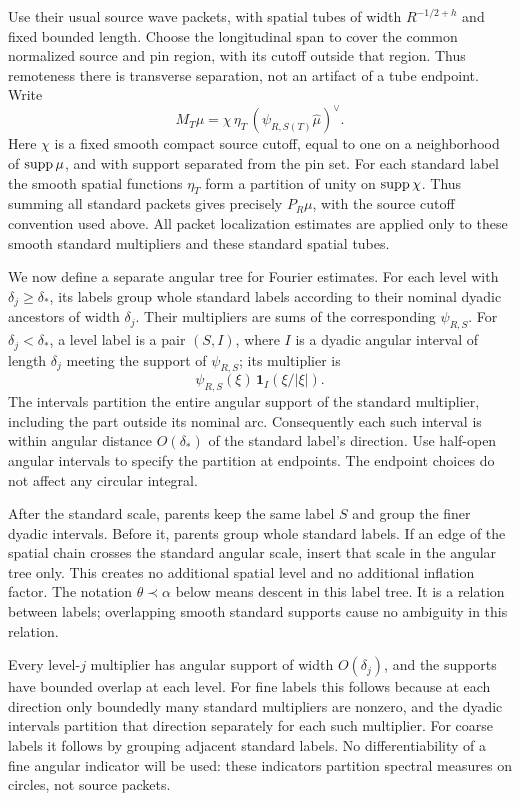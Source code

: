 Use their usual source wave packets, with spatial tubes of width
\(R^{-1/2+h}\) and fixed bounded length. Choose the longitudinal span
to cover the common normalized source and pin region, with its cutoff
outside that region. Thus remoteness there is transverse separation,
not an artifact of a tube endpoint. Write
$$
 M_T\mu=\chi\,\eta_T\,(\psi_{R,S(T)}\widehat\mu)^\vee.
$$
Here \(\chi\) is a fixed smooth compact source cutoff, equal to one on
a neighborhood of \(\operatorname{supp}\mu\), and with support separated from the pin
set. For each standard label the smooth spatial functions \(\eta_T\)
form a partition of unity on \(\operatorname{supp}\chi\). Thus summing all standard
packets gives precisely \(P_R\mu\), with the source cutoff convention
used above. All packet localization estimates are applied only to these
smooth standard multipliers and these standard spatial tubes.

We now define a separate angular tree for Fourier estimates. For each
level with \(\delta_j\geq\delta_*\), its labels group whole standard
labels according to their nominal dyadic ancestors of width \(\delta_j\).
Their multipliers are sums of the corresponding \(\psi_{R,S}\).
For \(\delta_j<\delta_*\), a level label is a pair \((S,I)\), where
\(I\) is a dyadic angular interval of length \(\delta_j\) meeting the
support of \(\psi_{R,S}\); its multiplier is
$$
 \psi_{R,S}(\xi)\,\mathbf 1_I(\xi/|\xi|).
$$
The intervals partition the entire angular support of the standard
multiplier, including the part outside its nominal arc. Consequently
each such interval is within angular distance \(O(\delta_*)\) of the
standard label's direction. Use half-open angular intervals to specify
the partition at endpoints. The endpoint choices do not affect any
circular integral.

After the standard scale, parents keep the same label \(S\) and group
the finer dyadic intervals. Before it, parents group whole standard
labels. If an edge of the spatial chain crosses the standard angular
scale, insert that scale in the angular tree only. This creates no
additional spatial level and no additional inflation factor.
The notation \(\theta\prec\alpha\) below means descent in this label
tree. It is a relation between labels; overlapping smooth standard
supports cause no ambiguity in this relation.

Every level-\(j\) multiplier has angular support of width
\(O(\delta_j)\), and the supports have bounded overlap at each level.
For fine labels this follows because at each direction only boundedly
many standard multipliers are nonzero, and the dyadic intervals partition
that direction separately for each such multiplier. For coarse labels
it follows by grouping adjacent standard labels. No differentiability
of a fine angular indicator will be used: these indicators partition
spectral measures on circles, not source packets.

